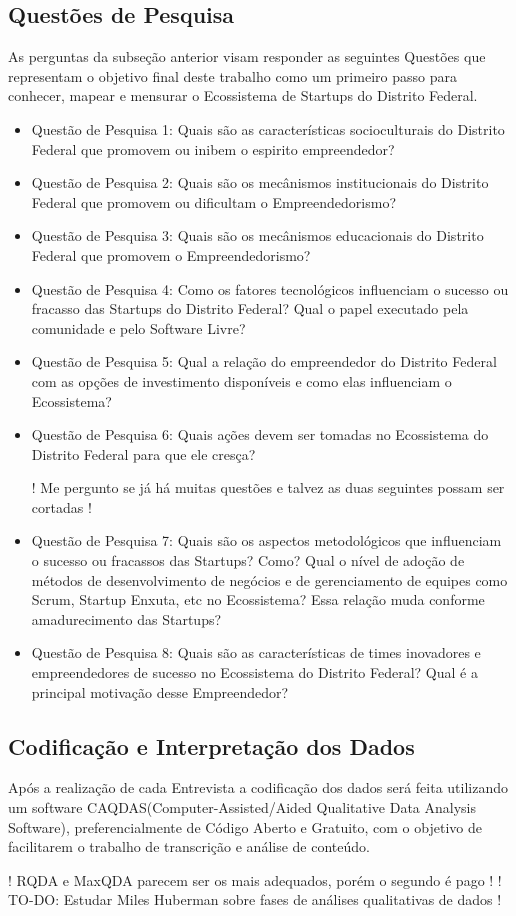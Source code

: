 \subsection{Questões de Pesquisa}
\label{subsection:questoes_de_pesquisa}

As perguntas da subseção anterior visam responder as seguintes Questões que representam o objetivo final deste trabalho como um primeiro passo para conhecer, mapear e mensurar o Ecossistema de Startups do Distrito Federal.

\begin{itemize}
  \item Questão de Pesquisa 1: Quais são as características socioculturais do Distrito Federal que promovem ou inibem o espirito empreendedor?
  \item Questão de Pesquisa 2: Quais são os mecânismos institucionais do Distrito Federal que promovem ou dificultam o Empreendedorismo?
  \item Questão de Pesquisa 3: Quais são os mecânismos educacionais do Distrito Federal que promovem o Empreendedorismo?
  \item Questão de Pesquisa 4: Como os fatores tecnológicos influenciam o sucesso ou fracasso das Startups do Distrito Federal? Qual o papel executado pela comunidade e pelo Software Livre?
  \item Questão de Pesquisa 5: Qual a relação do empreendedor do Distrito Federal com as opções de investimento disponíveis e como elas influenciam o Ecossistema?
  \item Questão de Pesquisa 6: Quais ações devem ser tomadas no Ecossistema do Distrito Federal para que ele cresça? 

  ! Me pergunto se já há muitas questões e talvez as duas seguintes possam ser cortadas !
  \item Questão de Pesquisa 7: Quais são os aspectos metodológicos que influenciam o sucesso ou fracassos das Startups? Como? Qual o nível de adoção de métodos de desenvolvimento de negócios e de gerenciamento de equipes como Scrum, Startup Enxuta, etc no Ecossistema? Essa relação muda conforme amadurecimento das Startups?
  \item Questão de Pesquisa 8: Quais são as características de times inovadores e empreendedores de sucesso no Ecossistema do Distrito Federal? Qual é a principal motivação desse Empreendedor?


\end{itemize}

\subsection{Codificação e Interpretação dos Dados}
\label{subsection:codificacao_e_interpretacao_dos_dados}

Após a realização de cada Entrevista a codificação dos dados será feita utilizando um software CAQDAS(Computer-Assisted/Aided Qualitative Data Analysis Software), preferencialmente de Código Aberto e Gratuito, com o objetivo de facilitarem o trabalho de transcrição e análise de conteúdo. 

! RQDA e MaxQDA parecem ser os mais adequados, porém o segundo é pago ! 
! TO-DO: Estudar Miles Huberman sobre fases de análises qualitativas de dados !